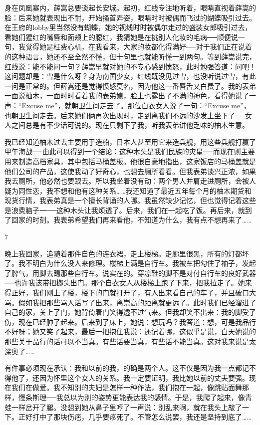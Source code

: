 身在凤凰寨内，薛嵩总要谈起长安城。起初，红线专注地听着，眼睛直视着薛嵩的脸：后来她就表现出不耐，开始搔首弄姿，眼睛时时被偶而飞过的蝴蝶吸引过去。在王府的lobby里当然没有蝴蝶，她的视线时时被偶尔走过的盛装女郎吸引过去，看她们猩红的嘴唇和面颊上的腮红，我猜她是在挑别人化妆的毛病──顺便说一句，我觉得她是枉费心机，在我看来，大家的妆都化得满好──对于我们正在说着的这种语言，她还不至全然不懂，但十句里也就能听懂一到两句。等到薛嵩说完，红线说：能不能问一句？薛嵩早就对她的不专心感到愤怒，此时勉强答道：问吧！这问题却是：雪是什么呀？身为南国少女，红线既没见过雪，也没听说过雪，有此一问是正常的。但薛嵩还是觉得愤怒莫名，因为他这一番唇舌又白费了。我的表弟一面说柚木，一面时时看着我的表弟媳，脸上也露出了不满的神色，看得她说了一声：“Excuse me”，就朝卫生间走去了。那位白衣女人说了一句：“Excuse me”，也朝卫生间走去。后来她们俩再次出现时，走到离我们不远的沙发上坐下了──女人之间总是有不少话可说的。现在只剩下了我，听我表弟讲他乏味的柚木生意。 

我已经知道柚木过去主要用于造船，日本人甚至用它来造兵舰，用这些兵舰打赢了甲午海战──由此可以得到一个结论：这种木头是我们民族的灾星──而现在则主要用来制造高档家具，其中包括马桶盖板。他很自豪地指出，这家饭店的马桶盖就是他们公司的产品，这使我动了好奇心，也想去厕所看看。但我表弟谈兴正浓，如果我去厕所，他必然也要跟去。所以我坐着没有动：两个男人并肩走进厕所，会被人疑为同性恋，我不想和他有这种关系……我还知道了最近五年每个月的柚木期贷和现货行情，我表弟真是一个擅长背诵的人哪。我虽然缺少记忆，但也觉得记着这些是浪费脑子一──这种木头让我烦透了。后来，我们在一起吃了饭。再后来，就到了回家的时刻。我表弟希望我们再来看他，不知道为什么，我有点不想再来了…… 

7 

晚上我回家，追随着那件自色的连衣裙，走上楼梯。走廊里很黑，所有的灯都坏了。我不明白为什么没人来修理。楼梯上满是自行车。我被车把勾住了袖子，发起了脾气，用脚去踢那些自行车。说实在的。穿凉鞋的脚不是对付自行车的良好武器──也许我该带把榔头出门。那个自衣女人从楼梯上跑了下来，把我拉走了。她来得正好，我们刚上了楼，楼下的门就打开了，有人出来看自己的车子，并且破口大骂。假如我把那些骂人话写了出来，离崇高的距离就更远了。此时我们已经溜进了自己的家，关上了门，她背倚着门笑得透不过气来。但我却笑不出来：我的脚受了伤，现在已经肿了起来。后来到了床上，她说：想玩吗？我答道：想，可是我品行不好呀；她又笑了起来，最后一把抱住我说：还记着哪，这似乎是说，白天她说的那些关于品行的话可以不当真。有些话要当真，有些话不能当真。这对我来说是太深奥了…… 

有件事必须现在承认：我和以前的我，的确是两个人。这不仅是因为我一点都记不得他了，还因为怀里这个女人的关系。我一定要证明，我比她以前的丈夫要强。现在我们在做爱。我不知别的夫妇是怎样一种作法，我们抱在一起，像跳贴面舞那样，慢条斯理──我总以为别的姿势更能表达我的感情。于是，我爬了起来，像青蛙一样岔开了腿。没想到她从鼻子里哼了一声说：别乱来啊，就在我头上敲了一下。正好打中了那块伤疤，几乎要疼死了。不管怎么说罢，我还是坚持到底了…… 

